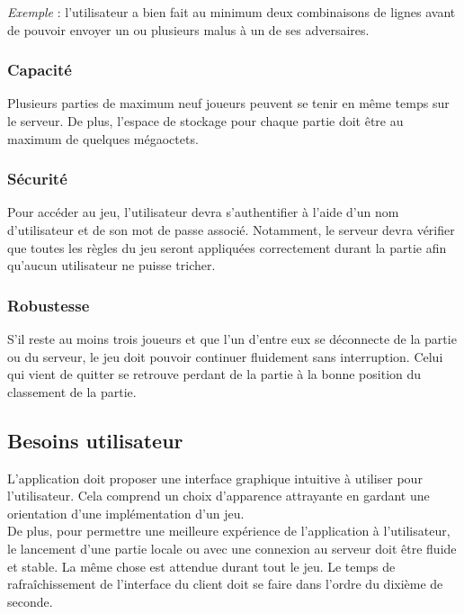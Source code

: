 \documentclass{article}
\begin{document}
\textit{Exemple} : l'utilisateur a bien fait au minimum deux combinaisons de lignes avant de pouvoir envoyer un ou plusieurs malus à un de ses adversaires.

\subsubsection{Capacité}


Plusieurs parties de maximum neuf joueurs peuvent se tenir en même temps sur le serveur. De plus, l'espace de stockage pour chaque partie doit être au maximum de quelques mégaoctets.

\subsubsection{Sécurité}


Pour accéder au jeu, l'utilisateur devra s'authentifier à l'aide d'un nom d'utilisateur et de son mot de passe associé. Notamment, le serveur devra vérifier que toutes les règles du jeu seront appliquées correctement durant la partie afin qu'aucun utilisateur ne puisse tricher. 

\subsubsection{Robustesse}

S'il reste au moins trois joueurs et que l'un d'entre eux se déconnecte de la partie ou du serveur, le jeu doit pouvoir continuer fluidement sans interruption. Celui qui vient de quitter se retrouve perdant de la partie à la bonne position du classement de la partie.

\subsection{Besoins utilisateur}

L'application doit proposer une interface graphique intuitive à utiliser pour l'utilisateur. Cela comprend un choix d'apparence attrayante en gardant une orientation d'une implémentation d'un jeu.\\
 De plus, pour permettre une meilleure expérience de l'application à l'utilisateur, le lancement d'une partie locale ou avec une connexion au serveur doit être fluide et stable. La même chose est attendue durant tout le jeu. Le temps de rafraîchissement de l'interface du client doit se faire dans l'ordre du dixième de seconde.
\end{document}
